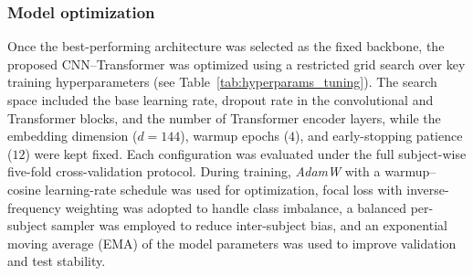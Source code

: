 \documentclass[a4paper,fleqn]{cas-dc}
\begin{document}
\subsubsection{Model optimization}
\label{model_optimization}
Once the best-performing architecture was selected as the fixed backbone, the proposed CNN–Transformer was optimized using a restricted grid search over key training hyperparameters (see Table~\ref{tab:hyperparams_tuning}). The search space included the base learning rate, dropout rate in the convolutional and Transformer blocks, and the number of Transformer encoder layers, while the embedding dimension ($d=144$), warmup epochs ($4$), and early-stopping patience ($12$) were kept fixed. Each configuration was evaluated under the full subject-wise five-fold cross-validation protocol. During training, \textit{AdamW} with a warmup–cosine learning-rate schedule was used for optimization, focal loss with inverse-frequency weighting was adopted to handle class imbalance, a balanced per-subject sampler was employed to reduce inter-subject bias, and an exponential moving average (EMA) of the model parameters was used to improve validation and test stability.

\begin{table}[t]
\centering
\caption{Hyperparameter search space explored during the statistical fine-tuning phase.}
\label{tab:hyperparams_tuning}
\footnotesize
\begin{threeparttable}
\end{threeparttable}
\end{table}
\end{document}
